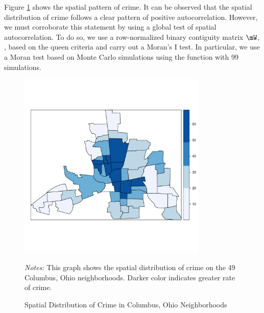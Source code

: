 \documentclass[english,12pt]{book}\usepackage[]{graphicx}\usepackage[]{xcolor}
\newenvironment{knitrout}{}{} %
\begin{document}
Figure \ref{fig:spatial-crime} shows the spatial pattern of crime. It can be observed that the spatial distribution of crime follows a clear pattern of positive autocorrelation. However, we must corroborate this statement by using a global test of spatial autocorrelation. To do so, we use a row-normalized binary contiguity matrix $\mW$, ,  based on the queen criteria and carry out a Moran's I test. In particular, we use a Moran test based on Monte Carlo simulations using the  function with 99 simulations. 

\begin{figure}[ht]
\caption{Spatial Distribution of Crime in Columbus, Ohio Neighborhoods}
    \label{fig:spatial-crime}
    \centering 
	\begin{minipage}{.9\linewidth}
\begin{knitrout}
\color{fgcolor}

{\centering \includegraphics[width=9cm,height=9cm]{figure/spatial-crime-1} 

}


\end{knitrout}
\footnotesize
		\emph{Notes:} This graph shows the spatial distribution of crime on the 49 Columbus, Ohio neighborhoods. Darker color indicates greater rate of crime. 
	\end{minipage}	
\end{figure}
\end{document}

